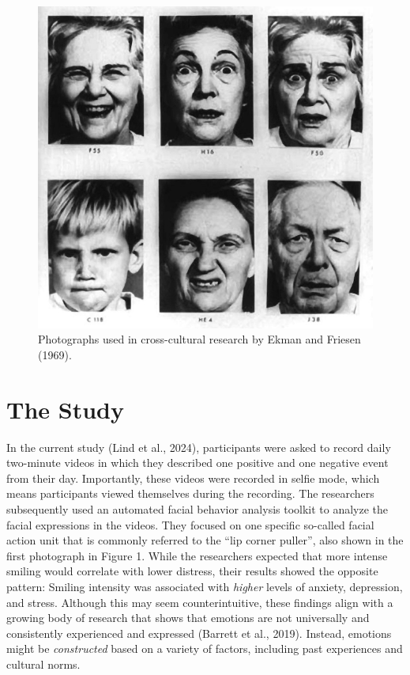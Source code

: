 \documentclass[authordate, reflection]{jote-new-article}
\begin{document}
	\begin{figure}
		\includegraphics[width=\linewidth]{media/image1.jpeg}

		\caption{Photographs used in cross-cultural research by Ekman and Friesen (1969).}

		\label{fig:rId6}


	\end{figure}







	\section{The Study }



	In the current study (Lind et al., 2024), participants were asked to record daily two-minute videos in which they described one positive and one negative event from their day. Importantly, these videos were recorded in selfie mode, which means participants viewed themselves during the recording. The researchers subsequently used an automated facial behavior analysis toolkit to analyze the facial expressions in the videos. They focused on one specific so-called facial action unit that is commonly referred to the “lip corner puller”, also shown in the first photograph in Figure 1. While the researchers expected that more intense smiling would correlate with lower distress, their results showed the opposite pattern: Smiling intensity was associated with \emph{higher} levels of anxiety, depression, and stress. Although this may seem counterintuitive, these findings align with a growing body of research that shows that emotions are not universally and consistently experienced and expressed (Barrett et al., 2019). Instead, emotions might be \emph{constructed} based on a variety of factors, including past experiences and cultural norms.
\end{document}
